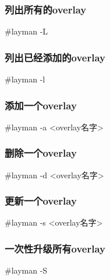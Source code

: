 \subsubsection*{列出所有的overlay}

\begin{code}
\#layman -L
\end{code}

\subsubsection*{列出已经添加的overlay}

\begin{code}
\#layman -l
\end{code}

\subsubsection*{添加一个overlay}

\begin{code}
\#layman -a <overlay名字>
\end{code}

\subsubsection*{删除一个overlay}

\begin{code}
\#layman -d <overlay名字>
\end{code}

\subsubsection*{更新一个overlay}

\begin{code}
\#layman -s <overlay名字>
\end{code}

\subsubsection*{一次性升级所有overlay}

\begin{code}
\#layman -S
\end{code}
